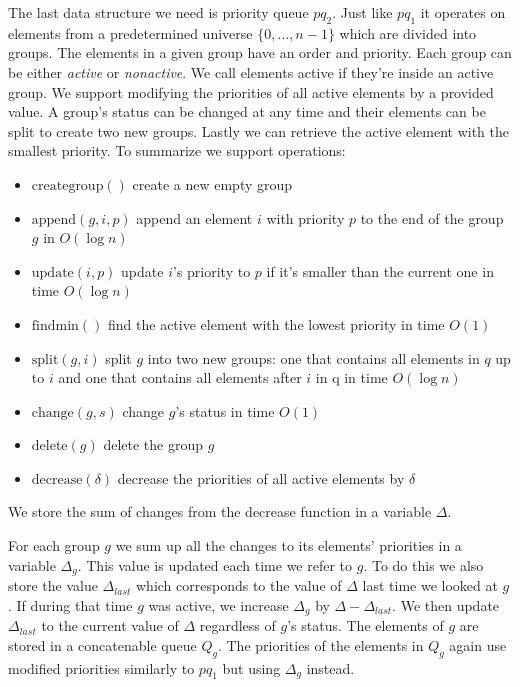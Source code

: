 The last data structure we need is priority queue $pq_2$. Just like $pq_1$ it operates on elements from a predetermined universe $\{0, \dots, n-1\}$ which are divided into groups. The elements in a given group have an order and priority. Each group can be either \textit{active} or \textit{nonactive}. We call elements active if they're inside an active group. We support modifying the priorities of all active elements by a provided value. A group's status can be changed at any time and their elements can be split to create two new groups. Lastly we can retrieve the active element with the smallest priority. To summarize we support operations:

\begin{itemize}
    \item $\text{creategroup}()$ create a new empty group
    \item $\text{append}(g, i, p)$ append an element $i$ with priority $p$ to the end of the group $g$ in $O(\log n)$
    \item $\text{update}(i, p)$ update $i$'s priority to $p$ if it's smaller than the current one in time $O(\log n)$
    \item $\text{findmin}()$ find the active element with the lowest priority in time $O(1)$
    \item $\text{split}(g, i)$ split $g$ into two new groups: one that contains all elements in $q$ up to $i$ and one that contains all elements after $i$ in q in time $O(\log n)$
    \item $\text{change}(g, s)$ change $g$'s status in time $O(1)$
    \item $\text{delete}(g)$ delete the group $g$
    \item $\text{decrease}(\delta)$ decrease the priorities of all active elements by $\delta$
\end{itemize}

We store the sum of changes from the decrease function in a variable $\Delta$.

For each group $g$ we sum up all the changes to its elements' priorities in a variable $\Delta_g$. This value is updated each time we refer to $g$. To do this we also store the value $\Delta_{last}$ which corresponds to the value of $\Delta$ last time we looked at $g$. If during that time $g$ was active, we increase $\Delta_g$ by $\Delta - \Delta_{last}$. We then update $\Delta_{last}$ to the current value of $\Delta$ regardless of $g$'s status. The elements of $g$ are stored in a concatenable queue $Q_g$. The priorities of the elements in $Q_g$ again use modified priorities similarly to $pq_1$ but using $\Delta_g$ instead. 

